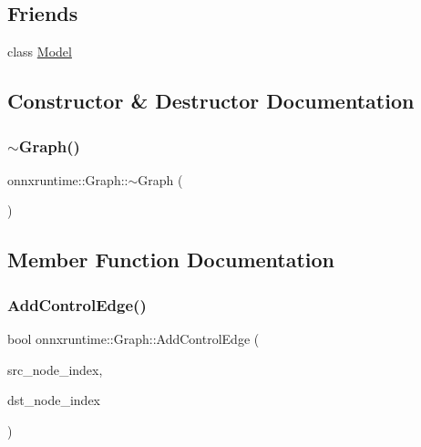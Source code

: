 \subsection*{Friends}
\begin{DoxyCompactItemize}
\item 
class \mbox{\hyperlink{classonnxruntime_1_1Graph_a2bf2a0e9b454c55aa5dcb5aa4698697b}{Model}}
\end{DoxyCompactItemize}


\subsection{Constructor \& Destructor Documentation}
\mbox{\label{classonnxruntime_1_1Graph_a798f54e43ac6ba2b10cf026a6365cdc5}} 
\subsubsection{\texorpdfstring{$\sim$\+Graph()}{~Graph()}}
{\footnotesize\ttfamily onnxruntime\+::\+Graph\+::$\sim$\+Graph (\begin{DoxyParamCaption}{ }\end{DoxyParamCaption})\hspace{0.3cm}{\ttfamily [virtual]}}



\subsection{Member Function Documentation}
\mbox{\label{classonnxruntime_1_1Graph_aa348aa7dc35abaeb91399992122e9b11}} 
\subsubsection{\texorpdfstring{Add\+Control\+Edge()}{AddControlEdge()}}
{\footnotesize\ttfamily bool onnxruntime\+::\+Graph\+::\+Add\+Control\+Edge (\begin{DoxyParamCaption}\item[{\mbox{\hyperlink{namespaceonnxruntime_af8773b5c12b5d8fd9292eb2e268df760}{Node\+Index}}}]{src\+\_\+node\+\_\+index,  }\item[{\mbox{\hyperlink{namespaceonnxruntime_af8773b5c12b5d8fd9292eb2e268df760}{Node\+Index}}}]{dst\+\_\+node\+\_\+index }\end{DoxyParamCaption})}

